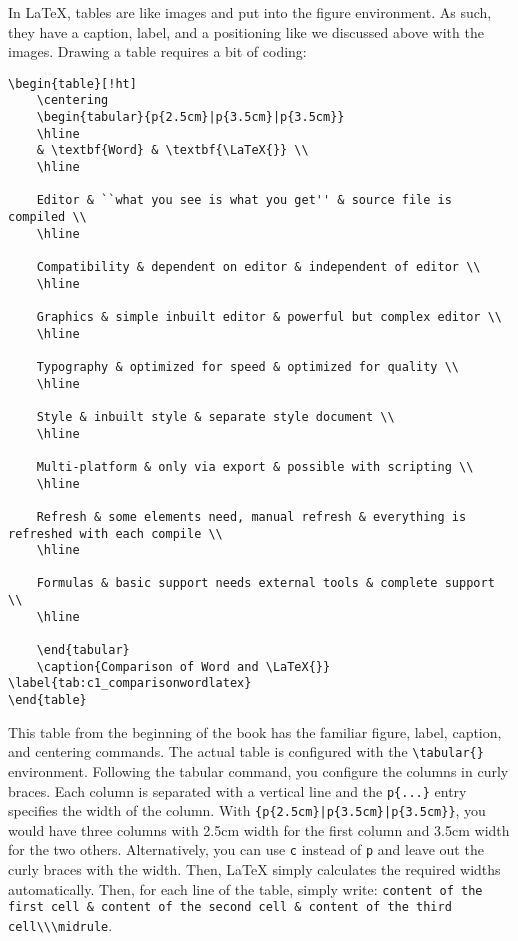 In \LaTeX{}, tables are like images and put into the figure environment. As
such, they have a caption, label, and a positioning like we discussed above with
the images. Drawing a table requires a bit of coding:
\begin{lstlisting}[language=Tex]
\begin{table}[!ht]
    \centering
    \begin{tabular}{p{2.5cm}|p{3.5cm}|p{3.5cm}}
    \hline
    & \textbf{Word} & \textbf{\LaTeX{}} \\ 
    \hline
    
    Editor & ``what you see is what you get'' & source file is compiled \\
    \hline
    
    Compatibility & dependent on editor & independent of editor \\
    \hline
    
    Graphics & simple inbuilt editor & powerful but complex editor \\
    \hline
    
    Typography & optimized for speed & optimized for quality \\
    \hline
    
    Style & inbuilt style & separate style document \\
    \hline
    
    Multi-platform & only via export & possible with scripting \\
    \hline
    
    Refresh & some elements need, manual refresh & everything is refreshed with each compile \\
    \hline
    
    Formulas & basic support needs external tools & complete support \\
    \hline
    
    \end{tabular}
    \caption{Comparison of Word and \LaTeX{}} \label{tab:c1_comparisonwordlatex}
\end{table}
\end{lstlisting}

This table from the beginning of the book has the familiar figure, label,
caption, and centering commands. The actual table is configured with the
\lstinline[language=Tex]!\tabular{}! environment. Following the tabular command,
you configure the columns in curly braces. Each column is separated with a
vertical line and the \lstinline[language=Tex]!p{...}! %
entry specifies the width
of the column. With \lstinline[language=Tex]!{p{2.5cm}|p{3.5cm}|p{3.5cm}}!, you
would have three columns with 2.5cm width for the first column and 3.5cm width
for the two others. Alternatively, you can use \lstinline[language=Tex]!c!
instead of \lstinline[language=Tex]!p! and leave out the curly braces with the
width. Then, \LaTeX{} simply calculates the required widths automatically. Then,
for each line of the table, simply write: 
\lstinline[language=Tex]!content of the first cell & content of the second cell & content of the third cell\\\midrule!.

